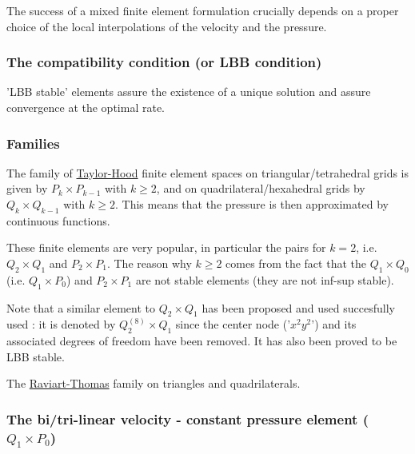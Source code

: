 

The success of a mixed finite element formulation crucially depends on a proper choice of the local interpolations of the velocity and the pressure. 

\subsubsection{The compatibility condition (or LBB condition)}
 

'LBB stable' elements assure the existence of a unique solution 
and assure convergence at the optimal rate. 

\subsubsection{Families}

The family of \underline{Taylor-Hood} finite element spaces on triangular/tetrahedral 
grids is given by $P_k \times P_{k-1}$ with $k\geq 2$, 
and on quadrilateral/hexahedral grids by $Q_k \times Q_{k-1}$ with $k\geq 2$.
This means that the pressure is then approximated by continuous functions. 

These finite elements are very popular, in particular the pairs for $k=2$, i.e.
$Q_2\times Q_1$ and $P_2\times P_1$.
The reason why $k\geq 2$ comes from the fact that the 
$Q_1 \times Q_0$ (i.e. $Q_1 \times P_0$) and $P_2\times P_1$
are not stable elements (they are not inf-sup stable). 

\begin{remark}
Note that a similar element to $Q_2 \times Q_1$ has been proposed
and used succesfully used \cite{taho73,hota74}: it is denoted by $Q_2^{(8)} \times Q_1$ 
since the center node ('$x^2y^2$') and its associated degrees of freedom have been removed. It 
has also been proved to be LBB stable. 
\end{remark}


The \underline{Raviart-Thomas} family on triangles and quadrilaterals.

\subsubsection{The bi/tri-linear velocity - constant pressure element ($Q_1\times P_0$)}

